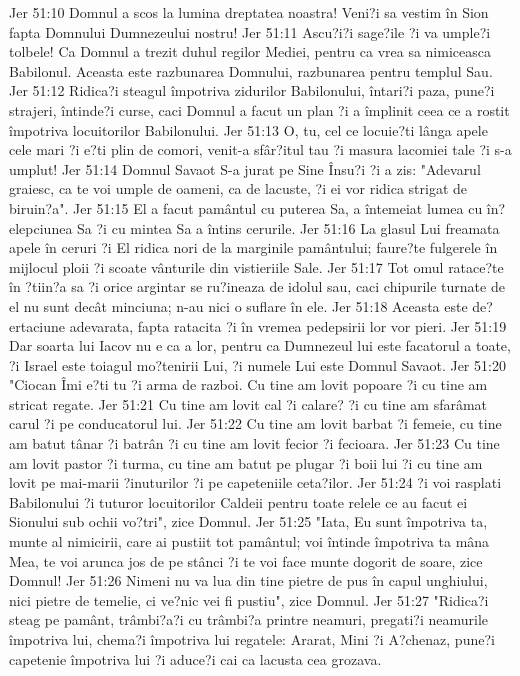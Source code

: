 Jer 51:10  Domnul a scos la lumina dreptatea noastra! Veni?i sa vestim în Sion fapta Domnului Dumnezeului nostru!
Jer 51:11  Ascu?i?i sage?ile ?i va umple?i tolbele! Ca Domnul a trezit duhul regilor Mediei, pentru ca vrea sa nimiceasca Babilonul. Aceasta este razbunarea Domnului, razbunarea pentru templul Sau.
Jer 51:12  Ridica?i steagul împotriva zidurilor Babilonului, întari?i paza, pune?i strajeri, întinde?i curse, caci Domnul a facut un plan ?i a împlinit ceea ce a rostit împotriva locuitorilor Babilonului.
Jer 51:13  O, tu, cel ce locuie?ti lânga apele cele mari ?i e?ti plin de comori, venit-a sfâr?itul tau ?i masura lacomiei tale ?i s-a umplut!
Jer 51:14  Domnul Savaot S-a jurat pe Sine Însu?i ?i a zis: "Adevarul graiesc, ca te voi umple de oameni, ca de lacuste, ?i ei vor ridica strigat de biruin?a".
Jer 51:15  El a facut pamântul cu puterea Sa, a întemeiat lumea cu în?elepciunea Sa ?i cu mintea Sa a întins cerurile.
Jer 51:16  La glasul Lui freamata apele în ceruri ?i El ridica nori de la marginile pamântului; faure?te fulgerele în mijlocul ploii ?i scoate vânturile din vistieriile Sale.
Jer 51:17  Tot omul ratace?te în ?tiin?a sa ?i orice argintar se ru?ineaza de idolul sau, caci chipurile turnate de el nu sunt decât minciuna; n-au nici o suflare în ele.
Jer 51:18  Aceasta este de?ertaciune adevarata, fapta ratacita ?i în vremea pedepsirii lor vor pieri.
Jer 51:19  Dar soarta lui Iacov nu e ca a lor, pentru ca Dumnezeul lui este facatorul a toate, ?i Israel este toiagul mo?tenirii Lui, ?i numele Lui este Domnul Savaot.
Jer 51:20  "Ciocan Îmi e?ti tu ?i arma de razboi. Cu tine am lovit popoare ?i cu tine am stricat regate.
Jer 51:21  Cu tine am lovit cal ?i calare? ?i cu tine am sfarâmat carul ?i pe conducatorul lui.
Jer 51:22  Cu tine am lovit barbat ?i femeie, cu tine am batut tânar ?i batrân ?i cu tine am lovit fecior ?i fecioara.
Jer 51:23  Cu tine am lovit pastor ?i turma, cu tine am batut pe plugar ?i boii lui ?i cu tine am lovit pe mai-marii ?inuturilor ?i pe capeteniile ceta?ilor.
Jer 51:24  ?i voi rasplati Babilonului ?i tuturor locuitorilor Caldeii pentru toate relele ce au facut ei Sionului sub ochii vo?tri", zice Domnul.
Jer 51:25  "Iata, Eu sunt împotriva ta, munte al nimicirii, care ai pustiit tot pamântul; voi întinde împotriva ta mâna Mea, te voi arunca jos de pe stânci ?i te voi face munte dogorit de soare, zice Domnul!
Jer 51:26  Nimeni nu va lua din tine pietre de pus în capul unghiului, nici pietre de temelie, ci ve?nic vei fi pustiu", zice Domnul.
Jer 51:27  "Ridica?i steag pe pamânt, trâmbi?a?i cu trâmbi?a printre neamuri, pregati?i neamurile împotriva lui, chema?i împotriva lui regatele: Ararat, Mini ?i A?chenaz, pune?i capetenie împotriva lui ?i aduce?i cai ca lacusta cea grozava.
